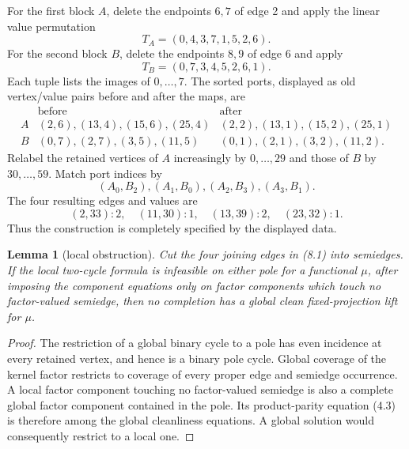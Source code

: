 \documentclass[11pt]{article}
\newtheorem{lemma}[theorem]{Lemma}
\theoremstyle{definition}
\theoremstyle{remark}
\begin{document}
For the first block \(A\), delete the endpoints \(6,7\) of edge 2 and
apply the linear value permutation
\[
                  T_A=(0,4,3,7,1,5,2,6).
\]
For the second block \(B\), delete the endpoints \(8,9\) of edge 6 and
apply
\[
                  T_B=(0,7,3,4,5,2,6,1).
\]
Each tuple lists the images of \(0,\ldots,7\).  The sorted ports, displayed
as old vertex/value pairs before and after the maps, are
\[
\begin{array}{c|c|c}
 &\text{before}&\text{after}\\ \hline
A&(2,6),(13,4),(15,6),(25,4)&(2,2),(13,1),(15,2),(25,1)\\
B&(0,7),(2,7),(3,5),(11,5)&(0,1),(2,1),(3,2),(11,2).
\end{array}
\]
Relabel the retained vertices of \(A\) increasingly by \(0,\ldots,29\)
and those of \(B\) by \(30,\ldots,59\).  Match port indices by
\[
                     (A_0,B_2),(A_1,B_0),(A_2,B_3),(A_3,B_1).
                                                        \tag{8.1}
\]
The four resulting edges and values are
\[
        (2,33):2,\quad(11,30):1,\quad(13,39):2,\quad(23,32):1.
                                                        \tag{8.2}
\]
Thus the construction is completely specified by the displayed data.

\begin{lemma}[local obstruction]\label{lem:pole}
Cut the four joining edges in (8.1) into semiedges.  If the local
two-cycle formula is infeasible on either pole for a functional \(\mu\),
after imposing the component equations only on factor components which
touch no factor-valued semiedge, then no completion has a global clean
fixed-projection lift for \(\mu\).
\end{lemma}

\begin{proof}
The restriction of a global binary cycle to a pole has even incidence at
every retained vertex, and hence is a binary pole cycle.  Global coverage
of the kernel factor restricts to coverage of every proper edge and
semiedge occurrence.  A local factor component touching no factor-valued
semiedge is also a complete global factor component contained in the
pole.  Its product-parity equation (4.3) is therefore among the global
cleanliness equations.  A global solution would consequently restrict to
a local one.
\end{proof}
\end{document}
